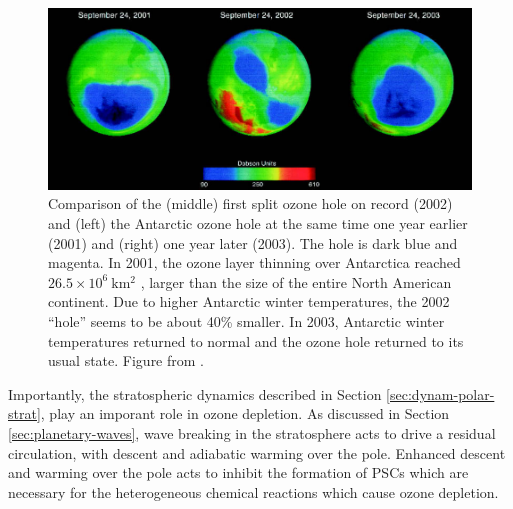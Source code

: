 
\begin{figure}
 \centering
 \noindent\includegraphics[width=\textwidth]{figures/chapter-intro/2002_SSW.png}
 \caption[]{Comparison of the (middle) first split ozone hole on record (2002)
   and (left) the Antarctic ozone hole at the same time one year earlier (2001)
   and (right) one year later (2003). The hole is dark blue and magenta. In
   2001, the ozone layer thinning over Antarctica reached
   $26.5 \times 10^6~\mathrm{km^2}$ , larger than the size of the entire North
   American continent. Due to higher Antarctic winter temperatures, the 2002
   ``hole'' seems to be about 40\% smaller. In 2003, Antarctic winter
   temperatures returned to normal and the ozone hole returned to its usual
   state. Figure from \citet{Shepherd2005}.}
 \label{fig:2002_SSW}
\end{figure}

Importantly, the stratospheric dynamics described in Section
\ref{sec:dynam-polar-strat}, play an imporant role in ozone depletion. As
discussed in Section \ref{sec:planetary-waves}, wave breaking in the
stratosphere acts to drive a residual circulation, with descent and adiabatic
warming over the pole. Enhanced descent and warming over the pole acts to
inhibit the formation of PSCs which are necessary for the heterogeneous chemical
reactions which cause ozone depletion. 

